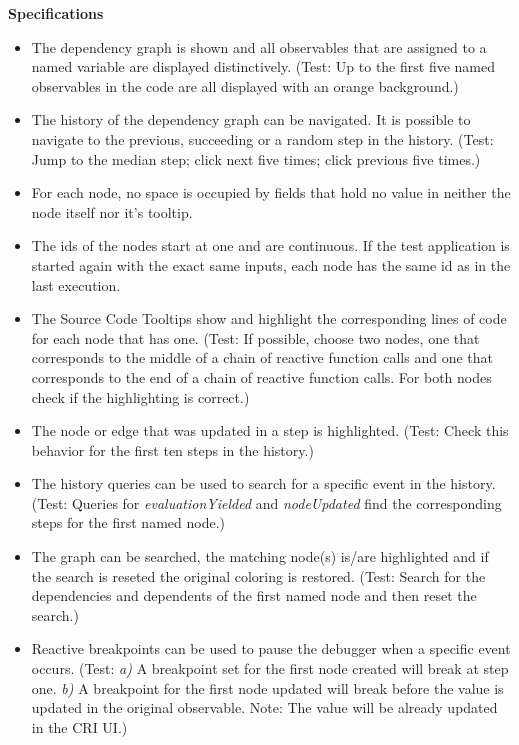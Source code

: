 \textbf{Specifications}
\begin{itemize}
	\item The dependency graph is shown and all observables that are assigned to a named variable are displayed distinctively. (Test: Up to the first five named observables in the code are all displayed with an orange background.)
	\item The history of the dependency graph can be navigated. It is possible to navigate to the previous, succeeding or a random step in the history. (Test: Jump to the median step; click next five times; click previous five times.)
	\item For each node, no space is occupied by fields that hold no value in neither the node itself nor it's tooltip.
	\item The ids of the nodes start at one and are continuous. If the test application is started again with the exact same inputs, each node has the same id as in the last execution.
	\item The Source Code Tooltips show and highlight the corresponding lines of code for each node that has one. (Test: If possible, choose two nodes, one that corresponds to the middle of a chain of reactive function calls and one that corresponds to the end of a chain of reactive function calls. For both nodes check if the highlighting is correct.)
	\item The node or edge that was updated in a step is highlighted. (Test: Check this behavior for the first ten steps in the history.)
	\item The history queries can be used to search for a specific event in the history. (Test: Queries for \emph{evaluationYielded} and \emph{nodeUpdated} find the corresponding steps for the first named node.)
	\item The graph can be searched, the matching node(s) is/are highlighted and if the search is reseted the original coloring is restored. (Test: Search for the dependencies and dependents of the first named node and then reset the search.)
	\item Reactive breakpoints can be used to pause the debugger when a specific event occurs. (Test: \emph{a)} A breakpoint set for the first node created will break at step one. \emph{b)} A breakpoint for the first node updated will break before the value is updated in the original observable. Note: The value will be already updated in the CRI UI.)
\end{itemize}


